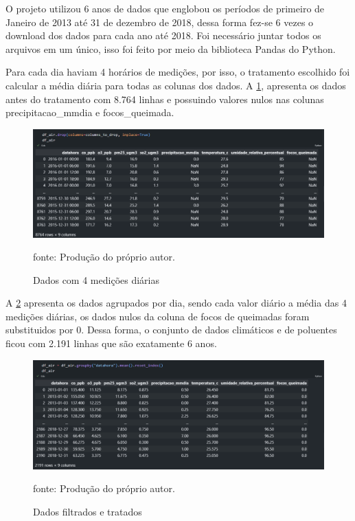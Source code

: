 \documentclass[
  12pt,		%
  a4paper,	%
  openright,%
  oneside,	%
  chapter=TITLE,		%
  section=TITLE,		%
  english,	%
  french,	%
  spanish,	%
  brazil	%
]{abntex2}
\begin{document}
    O projeto utilizou 6 anos de dados que englobou os períodos de primeiro de Janeiro de 2013 
    até 31 de dezembro de 2018, dessa forma fez-se 6 vezes o download dos dados para cada ano até 2018.
    Foi necessário juntar todos os arquivos em um único, isso foi feito por meio da biblioteca Pandas do Python.

    Para cada dia haviam 4 horários de medições, por isso, o tratamento escolhido foi 
    calcular a média diária para todas as colunas dos dados. 
    A \ref*{sisam_not_filtered}, apresenta os dados antes do tratamento com 8.764 linhas 
    e possuindo valores nulos nas colunas precipitacao\_mmdia e focos\_queimada.
    
    \begin{figure}[ht]
        \centering
        \caption{Dados com 4 medições diárias}
        \includegraphics[width=12cm]{../reports/figures/sisam_not_filtered.png}
        \label{sisam_not_filtered}
        \par
        {\small fonte: Produção do próprio autor.}
    \end{figure}

    A \ref*{sisam_filtered} apresenta os dados agrupados por dia, sendo cada valor diário a média das 4 medições diárias, os dados
    nulos da coluna de focos de queimadas foram substituidos por 0. Dessa forma, o conjunto de dados climáticos e de poluentes ficou
    com 2.191 linhas que são exatamente 6 anos.

    \begin{figure}[ht]
        \centering
        \caption{Dados filtrados e tratados}
        \includegraphics[width=12cm]{../reports/figures/filter_sisam.png}
        \label{sisam_filtered}
        \par
        {\small fonte: Produção do próprio autor.}
    \end{figure}
\end{document}
